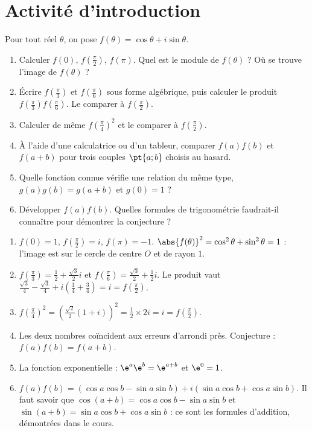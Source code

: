 \mxnewpage
\section{Activité d'introduction}
\begin{activity}
Pour tout réel $\theta$, on pose $f(\theta)=\cos\theta+i\sin\theta$.
\begin{enumerate}
\item Calculer $f(0)$, $f\left(\frac\pi2\right)$, $f(\pi)$. Quel est le module de $f(\theta)$ ? Où se trouve l'image de $f(\theta)$ ?
\item Écrire $f\left(\frac\pi3\right)$ et $f\left(\frac\pi6\right)$ sous forme algébrique, puis calculer le produit $f\left(\frac\pi3\right)f\left(\frac\pi6\right)$. Le comparer à $f\left(\frac\pi2\right)$.
\item Calculer de même $f\left(\frac\pi4\right)^2$ et le comparer à $f\left(\frac\pi2\right)$.
\item À l'aide d'une calculatrice ou d'un tableur, comparer $f(a)f(b)$ et $f(a+b)$ pour trois couples $\pt{a;b}$ choisis au hasard.
\item Quelle fonction connue vérifie une relation du même type, $g(a)g(b)=g(a+b)$ et $g(0)=1$ ?
\item Développer $f(a)f(b)$. Quelles formules de trigonométrie faudrait-il connaître pour démontrer la conjecture ?
\end{enumerate}
\end{activity}
\begin{solution}[Activité]
\begin{enumerate}
\item $f(0)=1$, $f\left(\frac\pi2\right)=i$, $f(\pi)=-1$. $\abs{f(\theta)}^2=\cos^2\theta+\sin^2\theta=1$ : l'image est sur le cercle de centre $O$ et de rayon $1$.
\item $f\left(\frac\pi3\right)=\frac12+\frac{\sqrt3}2i$ et $f\left(\frac\pi6\right)=\frac{\sqrt3}2+\frac12i$. Le produit vaut $\frac{\sqrt3}4-\frac{\sqrt3}4+i\left(\frac14+\frac34\right)=i=f\left(\frac\pi2\right)$.
\item $f\left(\frac\pi4\right)^2=\left(\frac{\sqrt2}2(1+i)\right)^2=\frac12\times2i=i=f\left(\frac\pi2\right)$.
\item Les deux nombres coïncident aux erreurs d'arrondi près. Conjecture : $f(a)f(b)=f(a+b)$.
\item La fonction exponentielle : $\e^a\e^b=\e^{a+b}$ et $\e^0=1$.
\item $f(a)f(b)=(\cos a\cos b-\sin a\sin b)+i(\sin a\cos b+\cos a\sin b)$. Il faut savoir que $\cos(a+b)=\cos a\cos b-\sin a\sin b$ et $\sin(a+b)=\sin a\cos b+\cos a\sin b$ : ce sont les formules d'addition, démontrées dans le cours.
\end{enumerate}
\end{solution}
